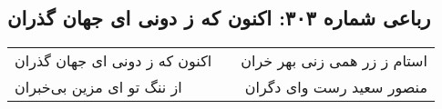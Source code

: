 \begin{center}
\section*{رباعی شماره ۳۰۳: اکنون که ز دونی ای جهان گذران}
\label{sec:sh303}
\begin{longtable}{l p{0.5cm} r}
اکنون که ز دونی ای جهان گذران
&&
استام ز زر همی زنی بهر خران
\\
از ننگ تو ای مزین بی‌خبران
&&
منصور سعید رست وای دگران
\\
\end{longtable}
\end{center}

